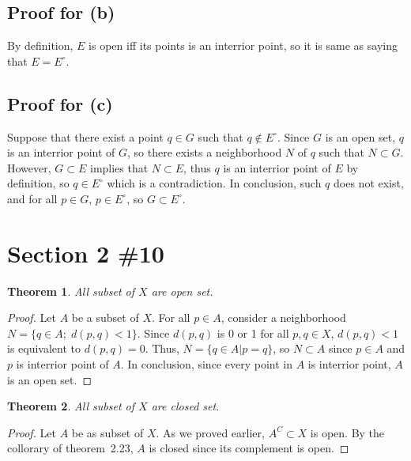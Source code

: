 \documentclass{scrartcl}
\newtheorem{theorem}{Theorem}
\begin{document}
\subsection{Proof for (b)}
By definition, \(E\) is open iff its points is an interrior point, so it is same as saying that \(E = E^\circ\).

\subsection{Proof for (c)}
Suppose that there exist a point \(q \in G\) such that \(q \not \in E^\circ\).
Since \(G\) is an open set, \(q\) is an interrior point of \(G\), so there exists a neighborhood \(N\) of \(q\) such that \(N \subset G\).
However, \(G \subset E\) implies that \(N \subset E\), thus \(q\) is an interrior point of \(E\) by definition, so \(q \in E^\circ\) which is a contradiction.
In conclusion, such \(q\) does not exist, and for all \(p \in G\), \(p \in E^\circ\), so \(G \subset E^\circ\).

\section{Section 2 \#10}
\begin{theorem}
  All subset of \(X\) are open set.
\end{theorem}
\begin{proof}
  Let \(A\) be a subset of \(X\).
  For all \(p \in A\), consider a neighborhood \(N = \{q \in A;\; d(p, q) < 1\}\).
  Since \(d(p, q)\) is 0 or 1 for all \(p, q \in X\), \(d(p, q) < 1\) is equivalent to \(d(p, q) = 0\).
  Thus, \(N = \{q \in A | p = q\}\), so \(N \subset A\) since \(p \in A\) and \(p\) is interrior point of \(A\).
  In conclusion, since every point in \(A\) is interrior point, \(A\) is an open set.
\end{proof}

\begin{theorem}
  All subset of \(X\) are closed set.
\end{theorem}
\begin{proof}
  Let \(A\) be as subset of \(X\).
  As we proved earlier, \(A^C \subset X\) is open.
  By the collorary of theorem~2.23, \(A\) is closed since its complement is open.
\end{proof}
\end{document}
